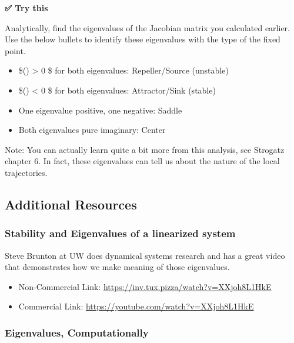 \textbf{✅ Try this}

Analytically, find the eigenvalues of the Jacobian matrix you calculated
earlier. Use the below bullets to identify these eigenvalues with the
type of the fixed point.

\begin{itemize}
\tightlist
\item
  \$(\lambda) \textgreater{} 0 \$ for both eigenvalues:
  Repeller/Source (unstable)
\item
  \$(\lambda) \textless{} 0 \$ for both eigenvalues:
  Attractor/Sink (stable)
\item
  One eigenvalue positive, one negative: Saddle
\item
  Both eigenvalues pure imaginary: Center
\end{itemize}

Note: You can actually learn quite a bit more from this analysis, see
Strogatz chapter 6. In fact, these eigenvalues can tell us about the
nature of the local trajectories.

\subsection{Additional Resources}\label{additional-resources}

\subsubsection{Stability and Eigenvalues of a linearized
system}\label{stability-and-eigenvalues-of-a-linearized-system}

Steve Brunton at UW does dynamical systems research and has a great
video that demonstrates how we make meaning of those eigenvalues.

\href{https://inv.tux.pizza/watch?v=XXjoh8L1HkE}{\pandocbounded{\texttt{[image: https://markdown-videos-api.jorgenkh.no/youtube/XXjoh8L1HkE?width=720\&height=405]}}}

\begin{itemize}
\tightlist
\item
  Non-Commercial Link: \url{https://inv.tux.pizza/watch?v=XXjoh8L1HkE}
\item
  Commercial Link: \url{https://youtube.com/watch?v=XXjoh8L1HkE}
\end{itemize}

\subsubsection{Eigenvalues,
Computationally}\label{eigenvalues-computationally}

